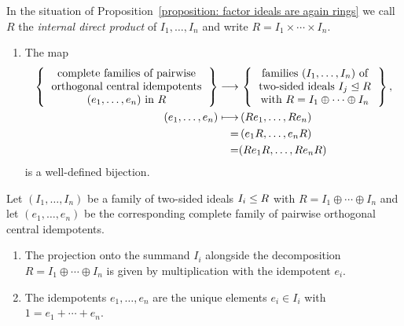 \begin{definition}
  \label{definition: internal direct product of rings}
  In the situation of Proposition~\ref{proposition: factor ideals are again rings} we call $R$ the \emph{internal direct product} of $I_1, \dotsc, I_n$ and write $R = I_1 \times \dotsb \times I_n$.
\end{definition}


\begin{theorem}
  \label{theorem: correspondence central idempotents and direct decompositions}
  \leavevmode
  \begin{enumerate}
    \item
      The map
      \begin{align*}
        \left\{
          \begin{tabular}{c}
            complete families of pairwise \\
            orthogonal central idempotents  \\
            $(e_1, \dotsc, e_n)$ in $R$
          \end{tabular}
        \right\}
        \longto&\,
          \left\{
          \begin{tabular}{c}
            families $(I_1, \dotsc, I_n)$ of  \\
            two-sided ideals $I_j \idealleq R$ \\
            with $R = I_1 \oplus \dotsb \oplus I_n$
          \end{tabular}
          \right\},
        \\
          (e_1, \dotsc, e_n)
        \longmapsto&\,
          (R e_1, \dotsc, R e_n)
        \\
                  =&\, 
          (e_1 R, \dotsc, e_n R)
        \\
                  =&
          (R e_1 R, \dotsc, R e_n R)
      \end{align*}
      is a well-defined bijection.
  \end{enumerate}
   Let $(I_1, \dotsc, I_n)$ be a family of two-sided ideals $I_i \leq R$ with $R = I_1 \oplus \dotsb \oplus I_n$ and let $(e_1, \dotsc, e_n)$ be the corresponding complete family of pairwise orthogonal central idempotents.
  \begin{enumerate}[resume]
    \item
      \label{enumerate: central idempotents are projections}
      The projection onto the summand $I_i$ alongside the decomposition $R = I_1 \oplus \dotsb \oplus I_n$ is given by multiplication with the idempotent $e_i$.
    \item 
      \label{enumerate: central idempotents are summands of 1}
      The idempotents $e_1, \dotsc, e_n$ are the unique elements $e_i \in I_i$ with $1 = e_1 + \dotsb + e_n$.
  \end{enumerate}
\end{theorem}


